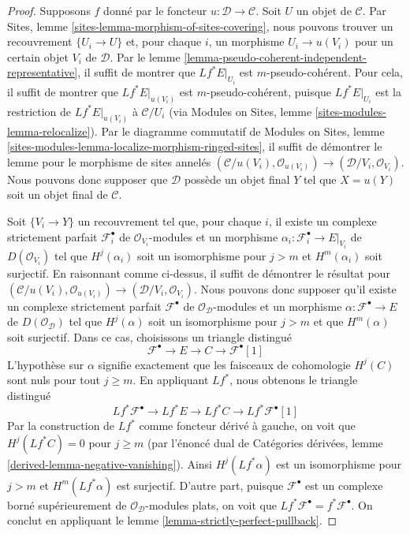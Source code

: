 \begin{proof}
Supposons $f$ donné par le foncteur $u : \mathcal{D} \to \mathcal{C}$.
Soit $U$ un objet de $\mathcal{C}$. Par Sites, lemme
\ref{sites-lemma-morphism-of-sites-covering}, nous pouvons trouver un
recouvrement $\{U_i \to U\}$ et, pour chaque $i$, un morphisme
$U_i \to u(V_i)$ pour un certain objet $V_i$ de $\mathcal{D}$.
Par le lemme \ref{lemma-pseudo-coherent-independent-representative},
il suffit de montrer que $Lf^*E|_{U_i}$ est $m$-pseudo-cohérent.
Pour cela, il suffit de montrer que $Lf^*E|_{u(V_i)}$ est
$m$-pseudo-cohérent, puisque $Lf^*E|_{U_i}$ est la restriction de
$Lf^*E|_{u(V_i)}$ à $\mathcal{C}/U_i$ (via Modules on Sites, lemme
\ref{sites-modules-lemma-relocalize}).
Par le diagramme commutatif de Modules on Sites, lemme
\ref{sites-modules-lemma-localize-morphism-ringed-sites}, il suffit de
démontrer le lemme pour le morphisme de sites annelés
$(\mathcal{C}/u(V_i), \mathcal{O}_{u(V_i)}) \to
(\mathcal{D}/V_i, \mathcal{O}_{V_i})$.
Nous pouvons donc supposer que $\mathcal{D}$ possède un objet final $Y$ tel
que $X = u(Y)$ soit un objet final de $\mathcal{C}$.

\medskip\noindent
Soit $\{V_i \to Y\}$ un recouvrement tel que, pour chaque $i$, il existe
un complexe strictement parfait $\mathcal{F}_i^\bullet$ de
$\mathcal{O}_{V_i}$-modules et un morphisme
$\alpha_i : \mathcal{F}_i^\bullet \to E|_{V_i}$ de $D(\mathcal{O}_{V_i})$
tel que $H^j(\alpha_i)$ soit un isomorphisme pour $j > m$ et
$H^m(\alpha_i)$ soit surjectif. En raisonnant comme ci-dessus, il suffit de
démontrer le résultat pour
$(\mathcal{C}/u(V_i), \mathcal{O}_{u(V_i)}) \to
(\mathcal{D}/V_i, \mathcal{O}_{V_i})$. Nous pouvons donc supposer qu'il
existe un complexe strictement parfait $\mathcal{F}^\bullet$ de
$\mathcal{O}_\mathcal{D}$-modules et un morphisme
$\alpha : \mathcal{F}^\bullet \to E$ de $D(\mathcal{O}_\mathcal{D})$ tel
que $H^j(\alpha)$ soit un isomorphisme pour $j > m$ et que
$H^m(\alpha)$ soit surjectif. Dans ce cas, choisissons un triangle distingué
$$
\mathcal{F}^\bullet \to E \to C \to \mathcal{F}^\bullet[1]
$$
L'hypothèse sur $\alpha$ signifie exactement que les faisceaux de cohomologie
$H^j(C)$ sont nuls pour tout $j \geq m$. En appliquant $Lf^*$, nous obtenons
le triangle distingué
$$
Lf^*\mathcal{F}^\bullet \to Lf^*E \to Lf^*C \to Lf^*\mathcal{F}^\bullet[1]
$$
Par la construction de $Lf^*$ comme foncteur dérivé à gauche, on voit que
$H^j(Lf^*C) = 0$ pour $j \geq m$ (par l'énoncé dual de Catégories dérivées,
lemme \ref{derived-lemma-negative-vanishing}). Ainsi $H^j(Lf^*\alpha)$ est
un isomorphisme pour $j > m$ et $H^m(Lf^*\alpha)$ est surjectif.
D'autre part, puisque $\mathcal{F}^\bullet$ est un complexe borné supérieurement
de $\mathcal{O}_\mathcal{D}$-modules plats, on voit que
$Lf^*\mathcal{F}^\bullet = f^*\mathcal{F}^\bullet$.
On conclut en appliquant le lemme \ref{lemma-strictly-perfect-pullback}.
\end{proof}

